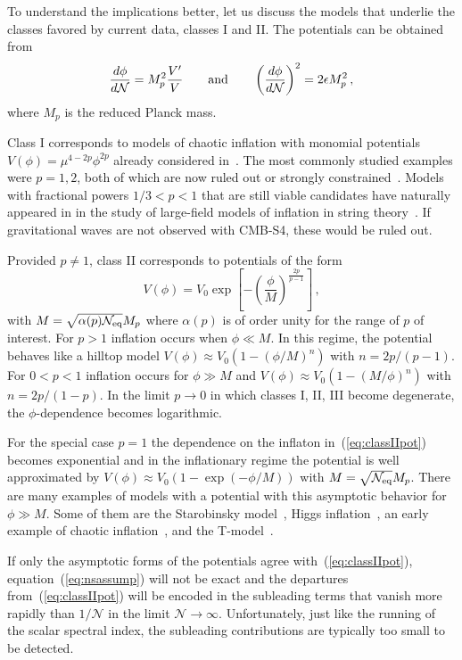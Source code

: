 To understand the implications better, let us discuss the models that underlie the classes favored by current data, classes I and II. The  potentials can be obtained from 
\begin{equation}
\frac{d\phi}{d\mathcal{N}}=M_p^2\frac{V'}{V}\qquad{\rm and}\qquad \left(\frac{d\phi}{d\mathcal{N}}\right)^2=2\epsilon M_p^2\,,
\end{equation}
where $M_p$ is the reduced Planck mass.

Class I corresponds to models of chaotic inflation with monomial potentials $V(\phi)=\mu^{4-2p}\phi^{2p}$
already considered in~\cite{Linde:1983gd}. The most commonly studied examples were $p=1,2$, both of which are now ruled out or strongly constrained~\cite{bicepkeckplanck15}. Models with fractional powers $1/3<p<1$ that are still viable candidates have naturally appeared in in the study of large-field models of inflation in string theory~\cite{Silverstein:2008sg,McAllister:2008hb,Flauger:2009ab}. If gravitational waves are not observed with CMB-S4, these would be ruled out.

Provided $p\neq 1$, class II corresponds to potentials of the form 
\begin{equation}\label{eq:classIIpot}
V(\phi)=V_0\exp\left[-\left(\frac{\phi}{M}\right)^{\frac{2p}{p-1}}\right]\,,
\end{equation}
with $M=\sqrt{\alpha(p)\mathcal{N}_{\rm eq}}M_p$ where $\alpha(p)$ is of order unity for the range of $p$ of interest. For $p>1$ inflation occurs when $\phi\ll M$. In this regime, the potential behaves like a hilltop model $V(\phi)\approx V_0(1-\left(\phi/M\right)^n)$ with $n=2p/(p-1)$. For $0<p<1$ inflation occurs for $\phi\gg M$ and $V(\phi)\approx V_0(1-\left(M/\phi\right)^n)$ with $n=2p/(1-p)$. In the limit $p\to0$ in which classes I, II, III become degenerate, the $\phi$-dependence becomes logarithmic. 

For the special case $p=1$ the dependence on the inflaton in~(\ref{eq:classIIpot}) becomes exponential and in the inflationary regime the potential is well approximated by $V(\phi)\approx V_0\left(1-\exp\left(-\phi/M\right)\right)$ with $M=\sqrt{\mathcal{N}_{\rm eq}}M_p$. There are many examples of models with a potential with this asymptotic behavior for $\phi\gg M$. Some of them are the Starobinsky model~\cite{Starobinsky:1980te}, Higgs inflation~\cite{Salopek:1988qh,Bezrukov:2007ep}, an early example of chaotic inflation~\cite{Goncharov:1983mw}, and the T-model~\cite{Kallosh:2013hoa}.

If only the asymptotic forms of the potentials agree with~(\ref{eq:classIIpot}), equation~(\ref{eq:nsassump}) will not be exact and the departures from~(\ref{eq:classIIpot}) will be encoded in the subleading terms that vanish more rapidly than $1/\mathcal{N}$ in the limit $\mathcal{N}\to\infty$. Unfortunately, just like the running of the scalar spectral index, the subleading contributions are typically too small to be detected.


